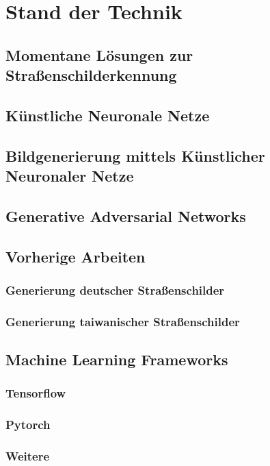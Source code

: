 \chapter{Stand der Technik}
\section{Momentane Lösungen zur Straßenschilderkennung}

\section{Künstliche Neuronale Netze}


\section{Bildgenerierung mittels Künstlicher Neuronaler Netze}


\section{Generative Adversarial Networks}


\section{Vorherige Arbeiten}
\subsection{Generierung deutscher Straßenschilder}
\cite{gtsrbGAN}
\subsection{Generierung taiwanischer Straßenschilder}
\cite{taiwanGAN}

\section{Machine Learning Frameworks}
\subsection{Tensorflow}
\subsection{Pytorch}
\subsection{Weitere}